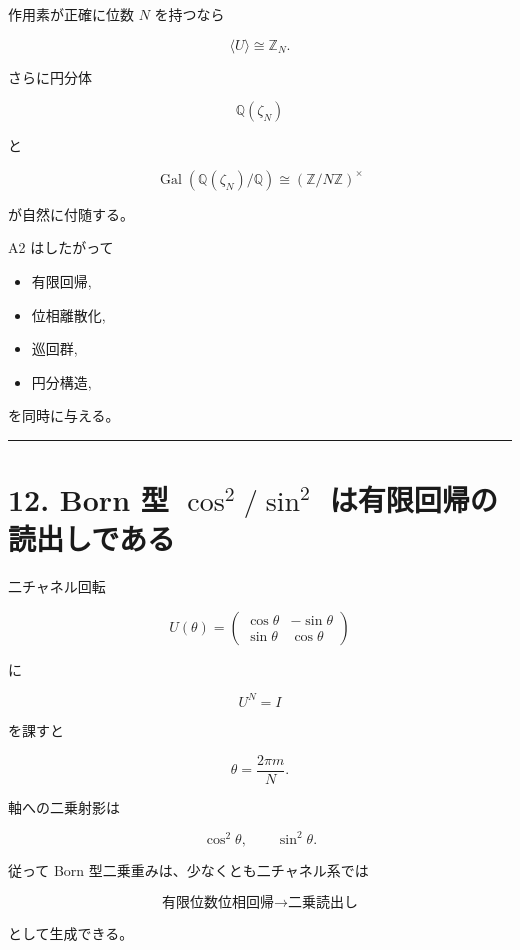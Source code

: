 \documentclass[
  a4paper,
]{ltjsarticle}
\providecommand{\tightlist}{%
  \setlength{\itemsep}{0pt}\setlength{\parskip}{0pt}}
\begin{document}
作用素が正確に位数 \(N\) を持つなら

\[
\boxed{
\langle U\rangle\cong\mathbb Z_N
}.
\]

さらに円分体

\[
\mathbb Q(\zeta_N)
\]

と

\[
\operatorname{Gal}
(\mathbb Q(\zeta_N)/\mathbb Q)
\cong
(\mathbb Z/N\mathbb Z)^\times
\]

が自然に付随する。

A2 はしたがって

\begin{itemize}
\tightlist
\item
  有限回帰,
\item
  位相離散化,
\item
  巡回群,
\item
  円分構造,
\end{itemize}

を同時に与える。

\begin{center}\rule{0.5\linewidth}{0.5pt}\end{center}

\section{\texorpdfstring{12. Born 型 \(\cos^2/\sin^2\)
は有限回帰の読出しである}{12. Born 型 \textbackslash cos\^{}2/\textbackslash sin\^{}2 は有限回帰の読出しである}}\label{born-ux578b-cos2sin2-ux306fux6709ux9650ux56deux5e30ux306eux8aadux51faux3057ux3067ux3042ux308b}

二チャネル回転

\[
U(\theta)
=
\begin{pmatrix}
\cos\theta&-\sin\theta\\
\sin\theta&\cos\theta
\end{pmatrix}
\]

に

\[
U^N=I
\]

を課すと

\[
\theta=\frac{2\pi m}{N}.
\]

軸への二乗射影は

\[
\boxed{
\cos^2\theta,\qquad\sin^2\theta
}.
\]

従って Born 型二乗重みは、少なくとも二チャネル系では

\[
\boxed{
\text{有限位数位相回帰}
\to
\text{二乗読出し}
}
\]

として生成できる。
\end{document}
